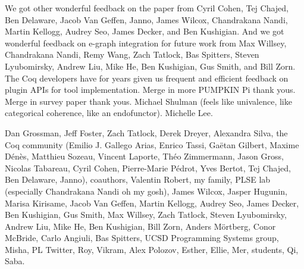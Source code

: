 \documentclass[ twoside,openright,titlepage,numbers=noenddot,headinclude,
                footinclude=true,cleardoublepage=empty,abstractoff,%
                BCOR=5mm,paper=letter,fontsize=11pt,letterpaper,%
                american,%
                ]{scrreprt}
\begin{document}
We got other wonderful feedback on the paper from 
Cyril Cohen, Tej Chajed, Ben Delaware, Jacob Van Geffen, Janno, James Wilcox, Chandrakana Nandi, 
Martin Kellogg, Audrey Seo, James Decker,
and Ben Kushigian.
And we got wonderful feedback on e-graph integration for future work from 
Max Willsey, Chandrakana Nandi, Remy Wang, Zach Tatlock, Bas Spitters, Steven Lyubomirsky, Andrew Liu, Mike He, Ben Kushigian, 
Gus Smith, and Bill Zorn.
The Coq developers have for years given us frequent and efficient feedback on plugin APIs for tool implementation.
Merge in more PUMPKIN Pi thank yous. Merge in survey paper thank yous.
Michael Shulman (feels like univalence, like categorical coherence, like an endofunctor).
Michelle Lee.

Dan Grossman, Jeff Foster, Zach Tatlock, Derek Dreyer, Alexandra Silva, the Coq community (Emilio J. Gallego Arias, Enrico Tassi, Ga\"{e}tan Gilbert, Maxime D\'{e}n\`{e}s,
Matthieu Sozeau, Vincent Laporte, Th\'{e}o Zimmermann, Jason Gross, Nicolas Tabareau, Cyril Cohen, Pierre-Marie P\'{e}drot, Yves Bertot, Tej Chajed, Ben Delaware, Janno), coauthors, Valentin Robert, my family, PLSE lab (especially Chandrakana Nandi oh my gosh), James Wilcox, Jasper Hugunin, Marisa Kirisame,
Jacob Van Geffen, Martin Kellogg, Audrey Seo, James Decker, Ben Kushigian, Gus Smith,
Max Willsey, Zach Tatlock, Steven Lyubomirsky, Andrew Liu, Mike He, Ben Kushigian, Bill Zorn,
Anders M\"ortberg, Conor McBride, Carlo Angiuli, Bas Spitters, 
UCSD Programming Systems group, Misha,
PL Twitter, Roy, Vikram, Alex Polozov, Esther, Ellie, Mer, students, Qi, Saba.


\cleardoublepage













\printindex

%



\end{document}
